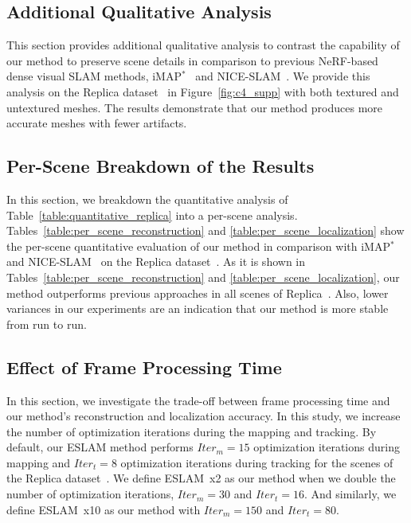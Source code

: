 \subsection{Additional Qualitative Analysis} \label{sec:c4_supp_additional}

This section provides additional qualitative analysis to contrast the capability of our method to preserve scene details in comparison to previous NeRF-based dense visual SLAM methods, iMAP$^*$~\citep{sucar2021imap} and NICE-SLAM~\citep{zhu2022nice}. We provide this analysis on the Replica dataset~\citep{replica19arxiv} in Figure~\ref{fig:c4_supp} with both textured and untextured meshes. The results demonstrate that our method produces more accurate meshes with fewer artifacts.

\subsection{Per-Scene Breakdown of the Results} \label{sec:c4_supp_per_scene}

In this section, we breakdown the quantitative analysis of Table~\ref{table:quantitative_replica} into a per-scene analysis. Tables~\ref{table:per_scene_reconstruction} and \ref{table:per_scene_localization} show the per-scene quantitative evaluation of our method in comparison with iMAP$^*$~\citep{sucar2021imap} and NICE-SLAM~\citep{zhu2022nice} on the Replica dataset~\citep{replica19arxiv}. As it is shown in Tables~\ref{table:per_scene_reconstruction} and \ref{table:per_scene_localization}, our method outperforms previous approaches in all scenes of Replica~\citep{replica19arxiv}. Also, lower variances in our experiments are an indication that our method is more stable from run to run.

\subsection{Effect of Frame Processing Time} \label{sec:c4_iters}

In this section, we investigate the trade-off between frame processing time and our method's reconstruction and localization accuracy. In this study, we increase the number of optimization iterations during the mapping and tracking. By default, our ESLAM method performs $Iter_{m}=15$ optimization iterations during mapping and $Iter_{t}=8$ optimization iterations during tracking for the scenes of the Replica dataset~\citep{replica19arxiv}. We define ESLAM~x2 as our method when we double the number of optimization iterations, \ie $Iter_{m}=30$ and $Iter_{t}=16$. And similarly, we define ESLAM~x10 as our method with $Iter_{m}=150$ and $Iter_{t}=80$.

